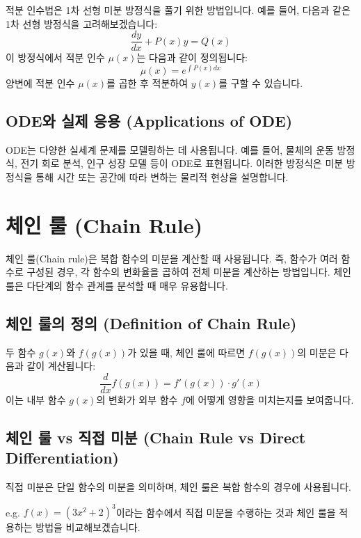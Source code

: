 \documentclass[12pt]{article}
\begin{document}
\noindent 적분 인수법은 1차 선형 미분 방정식을 풀기 위한 방법입니다. 예를 들어, 다음과 같은 1차 선형 방정식을 고려해보겠습니다:
\[
  \frac{dy}{dx} + P(x)y = Q(x)
\]
이 방정식에서 적분 인수 \( \mu(x) \)는 다음과 같이 정의됩니다:
\[
  \mu(x) = e^{\int P(x) dx}
\]
양변에 적분 인수 \( \mu(x) \)를 곱한 후 적분하여 \( y(x) \)를 구할 수 있습니다.

\subsection{ODE와 실제 응용 (Applications of ODE)}

\noindent ODE는 다양한 실세계 문제를 모델링하는 데 사용됩니다. 예를 들어, 물체의 운동 방정식, 전기 회로 분석, 인구 성장 모델 등이 ODE로 표현됩니다. 이러한 방정식은 미분 방정식을 통해 시간 또는 공간에 따라 변하는 물리적 현상을 설명합니다.

\section{체인 룰 (Chain Rule)}

\noindent 체인 룰(Chain rule)은 복합 함수의 미분을 계산할 때 사용됩니다. 즉, 함수가 여러 함수로 구성된 경우, 각 함수의 변화율을 곱하여 전체 미분을 계산하는 방법입니다. 체인 룰은 다단계의 함수 관계를 분석할 때 매우 유용합니다.

\subsection{체인 룰의 정의 (Definition of Chain Rule)}

\noindent 두 함수 \( g(x) \)와 \( f(g(x)) \)가 있을 때, 체인 룰에 따르면 \( f(g(x)) \)의 미분은 다음과 같이 계산됩니다:
\[
  \frac{d}{dx}f(g(x)) = f'(g(x)) \cdot g'(x)
\]
이는 내부 함수 \( g(x) \)의 변화가 외부 함수 \( f \)에 어떻게 영향을 미치는지를 보여줍니다.

\subsection{체인 룰 vs 직접 미분 (Chain Rule vs Direct Differentiation)}

\noindent 직접 미분은 단일 함수의 미분을 의미하며, 체인 룰은 복합 함수의 경우에 사용됩니다.

\vspace{2\baselineskip}
\noindent {} e.g. \( f(x) = (3x^2 + 2)^3 \)이라는 함수에서 직접 미분을 수행하는 것과 체인 룰을 적용하는 방법을 비교해보겠습니다.
\end{document}
